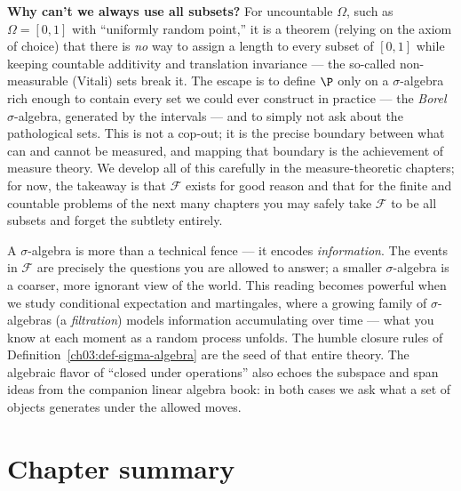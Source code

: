 \begin{formalbox}
\textbf{Why can't we always use all subsets?} For uncountable $\Omega$, such as
$\Omega = [0,1]$ with ``uniformly random point,'' it is a theorem (relying on the
axiom of choice) that there is \emph{no} way to assign a length to every subset of
$[0,1]$ while keeping countable additivity and translation invariance --- the
so-called non-measurable (Vitali) sets break it. The escape is to define $\P$
only on a $\sigma$-algebra rich enough to contain every set we could ever
construct in practice --- the \emph{Borel} $\sigma$-algebra, generated by the
intervals --- and to simply not ask about the pathological sets. This is not a
cop-out; it is the precise boundary between what can and cannot be measured, and
mapping that boundary is the achievement of measure theory. We develop all of
this carefully in the measure-theoretic chapters; for now, the takeaway is that
$\mathcal{F}$ exists for good reason and that for the finite and countable
problems of the next many chapters you may safely take $\mathcal{F}$ to be all
subsets and forget the subtlety entirely.
\end{formalbox}

\begin{connectionbox}
A $\sigma$-algebra is more than a technical fence --- it encodes
\emph{information}. The events in $\mathcal{F}$ are precisely the questions you are
allowed to answer; a smaller $\sigma$-algebra is a coarser, more ignorant view of
the world. This reading becomes powerful when we study conditional expectation
and martingales, where a growing family of $\sigma$-algebras (a
\emph{filtration}) models information accumulating over time --- what you know at
each moment as a random process unfolds. The humble closure rules of
Definition~\ref{ch03:def-sigma-algebra} are the seed of that entire theory. The
algebraic flavor of ``closed under operations'' also echoes the subspace and
span ideas from the companion linear algebra book: in both cases we ask what a
set of objects generates under the allowed moves.
\end{connectionbox}

\section{Chapter summary}
\label{ch03:summary}


